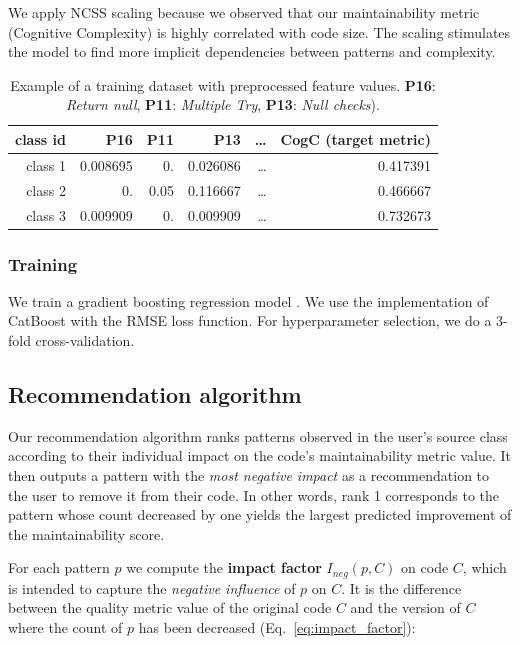 We apply NCSS scaling because we observed that our maintainability metric
(Cognitive Complexity) is highly correlated with code size. The scaling
stimulates the model to find more implicit dependencies between patterns and
complexity.

\begin{table}[H] \begin{center} \begin{tabular}{|r|rrrr|r|} \hline \textbf{class
id} & \textbf{P16} & \textbf{P11} &  \textbf{P13} & \dots & \textbf{CogC}
(target metric) \\ \hline \hline class 1 & 0.008695 & 0.         & 0.026086 &
\dots&  0.417391 \\ class 2 & 0.              & 0.05      & 0.116667 & \dots&
0.466667 \\  class 3 & 0.009909 & 0.         & 0.009909 & \dots & 0.732673 \\
\hline \end{tabular} \end{center} \caption{Example of a training dataset with
preprocessed feature values. \textbf{P16}: {\em Return null}, \textbf{P11}: {\em
Multiple Try},  \textbf{P13}: {\em Null checks}).} \label{tab:features_example}
\end{table}



\subsubsection*{Training}
We train a gradient boosting regression model \citep{Friedman2001GreedyFA}.
We use the implementation of CatBoost \citep{Dorogush2018CatBoostGB} with the RMSE loss function.
For hyperparameter selection, we do a 3-fold cross-validation.


\subsection{Recommendation algorithm}
\label{sec:recommendation_algorithm}
Our recommendation algorithm ranks
patterns observed in the user's source class according to their individual
impact on the code's maintainability metric value. It then outputs a pattern
with the \textit{most negative impact} as a recommendation to the user to remove
it from their code. In other words, rank 1 corresponds to the pattern whose
count decreased by one yields the largest predicted improvement of the
maintainability score.

For each pattern $p$ we compute the \textbf{impact factor} $I_{\textit{neg}}(p, C)$
on code $C$, which is intended to capture the \textit{negative
influence} of $p$ on $C$. It is the difference between the quality metric value
of the original code $C$ and the version of $C$ where the count of $p$ has been
decreased (Eq.~\ref{eq:impact_factor}):

